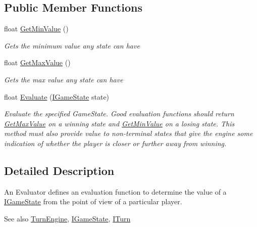 \subsection*{Public Member Functions}
\begin{DoxyCompactItemize}
\item 
float \hyperlink{interface_universal_turn_based_a_i_1_1_i_evaluator_a3e18d32b8171e37cd8a85976da5a363b}{Get\+Min\+Value} ()
\begin{DoxyCompactList}\small\item\em Gets the minimum value any state can have \end{DoxyCompactList}\item 
float \hyperlink{interface_universal_turn_based_a_i_1_1_i_evaluator_afa2d8a740cfe84f7a799a04dc5582e27}{Get\+Max\+Value} ()
\begin{DoxyCompactList}\small\item\em Gets the max value any state can have \end{DoxyCompactList}\item 
float \hyperlink{interface_universal_turn_based_a_i_1_1_i_evaluator_a845b25fea2bcf05593955cdd38ec183c}{Evaluate} (\hyperlink{interface_universal_turn_based_a_i_1_1_i_game_state}{I\+Game\+State} state)
\begin{DoxyCompactList}\small\item\em Evaluate the specified Game\+State. Good evaluation functions should return \hyperlink{interface_universal_turn_based_a_i_1_1_i_evaluator_afa2d8a740cfe84f7a799a04dc5582e27}{Get\+Max\+Value} on a winning state and \hyperlink{interface_universal_turn_based_a_i_1_1_i_evaluator_a3e18d32b8171e37cd8a85976da5a363b}{Get\+Min\+Value} on a losing state. This method must also provide value to non-\/terminal states that give the engine some indication of whether the player is closer or further away from winning. \end{DoxyCompactList}\end{DoxyCompactItemize}


\subsection{Detailed Description}
An Evaluator defines an evaluation function to determine the value of a \hyperlink{interface_universal_turn_based_a_i_1_1_i_game_state}{I\+Game\+State} from the point of view of a particular player. 

\begin{DoxySeeAlso}{See also}
\hyperlink{class_universal_turn_based_a_i_1_1_turn_engine}{Turn\+Engine}, \hyperlink{interface_universal_turn_based_a_i_1_1_i_game_state}{I\+Game\+State}, \hyperlink{interface_universal_turn_based_a_i_1_1_i_turn}{I\+Turn}


\end{DoxySeeAlso}


